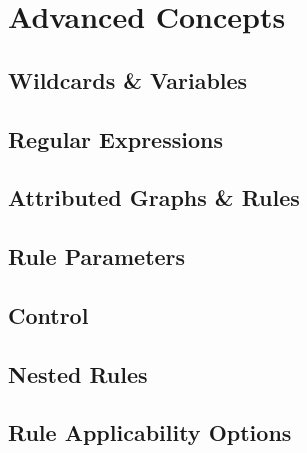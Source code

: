 \section{Advanced Concepts}

\subsection{Wildcards \& Variables}

\subsection{Regular Expressions}

\subsection{Attributed Graphs \& Rules}

\subsection{Rule Parameters}

\subsection{Control}

\subsection{Nested Rules}

\subsection{Rule Applicability Options}